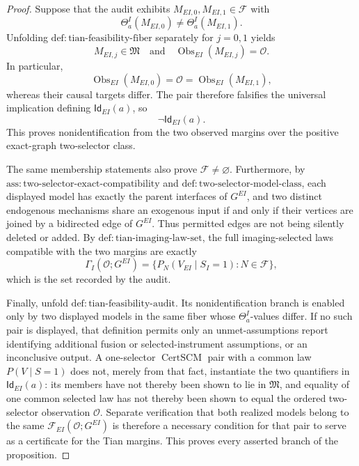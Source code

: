 \documentclass{article}
\begin{document}
\begin{proof}
Suppose that the audit exhibits \(M_{EI,0},M_{EI,1}\in\mathcal F\) with
\[
 \Theta^I_a(M_{EI,0})\ne\Theta^I_a(M_{EI,1}).
\]
Unfolding \(\mathrm{def:tian\text{-}feasibility\text{-}fiber}\) separately for \(j=0,1\) yields
\[
 M_{EI,j}\in\mathfrak M
 \quad\text{and}\quad
 \operatorname{Obs}_{EI}(M_{EI,j})=\mathcal O.
\]
In particular,
\[
 \operatorname{Obs}_{EI}(M_{EI,0})
 =\mathcal O
 =\operatorname{Obs}_{EI}(M_{EI,1}),
\]
whereas their causal targets differ.  The pair therefore falsifies the universal implication defining \(\mathsf{Id}_{EI}(a)\), so
\[
 \neg\mathsf{Id}_{EI}(a).
\]
This proves nonidentification from the two observed margins over the positive exact-graph two-selector class.

The same membership statements also prove \(\mathcal F\ne\varnothing\).  Furthermore, by \(\mathrm{ass:two\text{-}selector\text{-}exact\text{-}compatibility}\) and \(\mathrm{def:two\text{-}selector\text{-}model\text{-}class}\), each displayed model has exactly the parent interfaces of \(G^{EI}\), and two distinct endogenous mechanisms share an exogenous input if and only if their vertices are joined by a bidirected edge of \(G^{EI}\).  Thus permitted edges are not being silently deleted or added.  By \(\mathrm{def:tian\text{-}imaging\text{-}law\text{-}set}\), the full imaging-selected laws compatible with the two margins are exactly
\[
 \Gamma_I(\mathcal O;G^{EI})
 =\{P_N(V_{EI}\mid S_I=1):N\in\mathcal F\},
\]
which is the set recorded by the audit.

Finally, unfold \(\mathrm{def:tian\text{-}feasibility\text{-}audit}\).  Its nonidentification branch is enabled only by two displayed models in the same fiber whose \(\Theta^I_a\)-values differ.  If no such pair is displayed, that definition permits only an unmet-assumptions report identifying additional fusion or selected-instrument assumptions, or an inconclusive output.  A one-selector \(\operatorname{CertSCM}\) pair with a common law \(P(V\mid S=1)\) does not, merely from that fact, instantiate the two quantifiers in \(\mathsf{Id}_{EI}(a)\): its members have not thereby been shown to lie in \(\mathfrak M\), and equality of one common selected law has not thereby been shown to equal the ordered two-selector observation \(\mathcal O\).  Separate verification that both realized models belong to the same \(\mathcal F_{EI}(\mathcal O;G^{EI})\) is therefore a necessary condition for that pair to serve as a certificate for the Tian margins.  This proves every asserted branch of the proposition.
\end{proof}
\end{document}
